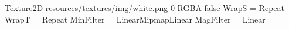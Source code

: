 Texture2D
resources/textures/img/white.png
0
RGBA
false
WrapS = Repeat
WrapT = Repeat
MinFilter = LinearMipmapLinear
MagFilter = Linear
